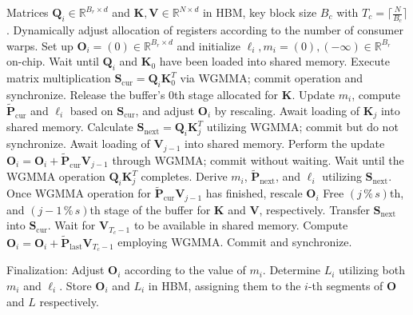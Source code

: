 \begin{algorithm}[H]
    \caption{\small\label{alg:flash3_wgmma}\textsc{FlashAttention-3} consumer warpgroup forward pass}
    \begin{algorithmic}[1]
      \REQUIRE  Matrices $\mathbf{Q}_i \in \mathbb{R}^{B_r \times d}$ and $\mathbf{K}, \mathbf{V} \in \mathbb{R}^{N \times d}$ in HBM, key block size $B_c$ with $T_c = \lceil \frac{N}{B_c} \rceil$.
      \STATE Dynamically adjust allocation of registers according to the number of consumer warps.
      \STATE Set up $\mathbf{O}_i = (0) \in \mathbb{R}^{B_r \times d}$ and initialize $\ell_i, m_i = (0), (-\infty) \in \mathbb{R}^{B_r}$ on-chip.
      \STATE Wait until $\mathbf{Q}_i$ and $\mathbf{K}_0$ have been loaded into shared memory.
      \STATE Execute matrix multiplication $\mathbf{S}_{\mathrm{cur}} = \mathbf{Q}_i \mathbf{K}_0^T$ via WGMMA; commit operation and synchronize.
      \STATE Release the buffer's $0$th stage allocated for $\mathbf{K}$.
      \STATE Update $m_i$, compute $\tilde{\mathbf{P}}_{\mathrm{cur}}$ and $\ell_{i}$ based on $\mathbf{S}_{\mathrm{cur}}$, and adjust $\mathbf{O}_i$ by rescaling.
        \STATE Await loading of $\mathbf{K}_j$ into shared memory.
        \label{code:mainloop_start}
        \STATE Calculate $\mathbf{S}_{\mathrm{next}} = \mathbf{Q}_i \mathbf{K}_j^T$ utilizing WGMMA; commit but do not synchronize. \label{code:first_wgmma}
        \STATE Await loading of $\mathbf{V}_{j-1}$ into shared memory.
        \STATE Perform the update $\mathbf{O}_i = \mathbf{O}_i + \tilde{\mathbf{P}}_{\mathrm{cur}} \mathbf{V}_{j-1}$ through WGMMA; commit without waiting. \label{code:second_wgmma}
        \STATE Wait until the WGMMA operation $\mathbf{Q}_i \mathbf{K}_j^T$ completes.
        \STATE Derive $m_{i}$, $\tilde{\mathbf{P}}_{\mathrm{next}}$, and $\ell_{i}$ utilizing $\mathbf{S}_{\mathrm{next}}$. \label{code:softmax}
        \STATE Once WGMMA operation for $\tilde{\mathbf{P}}_{\mathrm{cur}} \mathbf{V}_{j-1}$ has finished, rescale $\mathbf{O}_i$
        \STATE Free $(j\,\%\,s)$th, and $(j-1\,\%\,s)$th stage of the buffer for $\mathbf{K}$ and $\mathbf{V}$, respectively.
        \STATE Transfer $\mathbf{S}_{\mathrm{next}}$ into $\mathbf{S}_{\mathrm{cur}}$.
        \label{code:mainloop_end}
      \ENDFOR \STATE Wait for $\mathbf{V}_{T_c - 1}$ to be available in shared memory.
      \STATE Compute
      $\mathbf{O}_{i} = \mathbf{O}_{i} + \tilde{\mathbf{P}}_{\mathrm{last}} \mathbf{V}_{T_c - 1}$ employing WGMMA. Commit and synchronize.

\STATE Finalization: Adjust $\mathbf{O}_{i}$ according to the value of $m_{i}$. Determine $L_{i}$ utilizing both $m_{i}$ and $\ell_{i}$. Store $\mathbf{O}_{i}$ and $L_{i}$ in HBM, assigning them to the $i$-th segments of $\mathbf{O}$ and $L$ respectively.


\end{algorithmic}
\end{algorithm}
